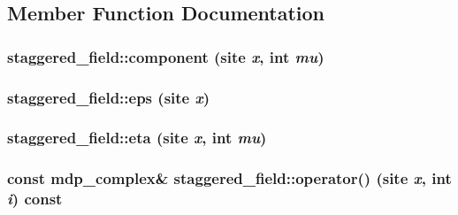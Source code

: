 \subsection{Member Function Documentation}
\hypertarget{classstaggered__field_a613e227e2cc092c103ce431000fd4b53}{
\subsubsection[{component}]{ staggered\_\-field::component (site {\em x}, \/  int {\em mu})}}
\label{classstaggered__field_a613e227e2cc092c103ce431000fd4b53}
\hypertarget{classstaggered__field_ae89b67366b3566c3c8a89d3303dc1d62}{
\subsubsection[{eps}]{ staggered\_\-field::eps (site {\em x})}}
\label{classstaggered__field_ae89b67366b3566c3c8a89d3303dc1d62}
\hypertarget{classstaggered__field_a2f865e7dbd982109e584d26687f5340d}{
\subsubsection[{eta}]{ staggered\_\-field::eta (site {\em x}, \/  int {\em mu})}}
\label{classstaggered__field_a2f865e7dbd982109e584d26687f5340d}
\hypertarget{classstaggered__field_a8cee97da0e262753ab059ef553597a01}{
\subsubsection[{operator()}]{\setlength{\rightskip}{0pt plus 5cm}const {\bf mdp\_\-complex}\& staggered\_\-field::operator() (site {\em x}, \/  int {\em i}) const}}

